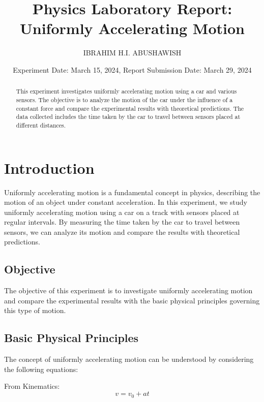 \documentclass[twocolumn]{article}
\begin{document}
\title{\textbf{Physics Laboratory Report: Uniformly Accelerating Motion}}
\author{IBRAHIM H.I. ABUSHAWISH}
\date{Experiment Date: March 15, 2024, Report Submission Date: March 29, 2024}
\maketitle

\begin{abstract}
    This experiment investigates uniformly accelerating motion using a car and various sensors. The objective is to analyze the motion of the car under the influence of a constant force and compare the experimental results with theoretical predictions. The data collected includes the time taken by the car to travel between sensors placed at different distances.
\end{abstract}

\section{Introduction}
\label{sec:introduction}
Uniformly accelerating motion is a fundamental concept in physics, describing the motion of an object under constant acceleration. In this experiment, we study uniformly accelerating motion using a car on a track with sensors placed at regular intervals. By measuring the time taken by the car to travel between sensors, we can analyze its motion and compare the results with theoretical predictions.
\subsection{Objective}

The objective of this experiment is to investigate uniformly accelerating motion and compare the experimental results with the basic physical principles governing this type of motion.
\subsection{Basic Physical Principles}

The concept of uniformly accelerating motion can be understood by considering the following equations:

From Kinematics: 
\begin{equation}
v = v_0 + at
\label{eq:kinematics1}
\end{equation}
\end{document}
